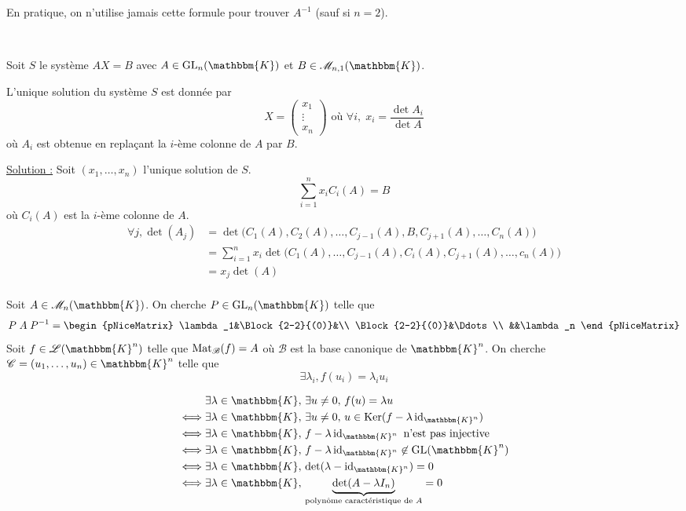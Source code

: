 \begin{rmk}
	En pratique, on n'utilise jamais cette formule pour trouver $A^{-1}$ (sauf si $n = 2$).
\end{rmk}

\begin{exo}~

	Soit $S$ le système $AX = B$ avec $A \in \mathrm{GL}_n(\mathbbm{K})$ et $B \in \mathcal{M}_{n,1}(\mathbbm{K})$.

	L'unique solution du système $S$ est donnée par \[
		X = \begin{pmatrix}
			x_1\\\vdots\\x_n
		\end{pmatrix} \text{ où } \forall i,\; x_i = \frac{\det A_i}{\det A}
	\] où $A_i$ est obtenue en repla\c cant la $i$-ème colonne de $A$ par $B$.

	\underline{Solution :} Soit $(x_1, \ldots, x_n)$ l'unique solution de $S$. \[
		\sum_{i=1}^n x_i C_i(A) = B
	\] où $C_i(A)$ est la $i$-ème colonne de $A$.
	\begin{align*}
		\forall j, \det(A_j) &= \det\big(C_1(A), C_2(A), \ldots, C_{j-1}(A), B, C_{j+1}(A),\ldots, C_n(A)\big)\\
		&= \sum_{i=1}^n x_i \det\big(C_1(A), \ldots, C_{j-1}(A), C_i(A), C_{j+1}(A), \ldots, c_n(A)\big) \\
		&= x_j \det(A) \\
	\end{align*}
\end{exo}


Soit $A \in \mathcal{M}_n(\mathbbm{K})$. On cherche $P \in \mathrm{GL}_n(\mathbbm{K})$ telle que \[
	P\;A\;P^{-1} =
	\begin{pNiceMatrix}
		\lambda_1&\Block{2-2}{(0)}&\\
		\Block{2-2}{(0)}&\Ddots\\
		&&\lambda_n
	\end{pNiceMatrix}
\] Soit $f \in \mathcal{L}(\mathbbm{K}^n)$ telle que $\operatorname{Mat}_\mathcal{B}(f) = A$ où $\mathcal{B}$ est la base canonique de $\mathbbm{K}^n$. On cherche $\mathcal{C} = (u_1, \ldots, u_n) \in \mathbbm{K}^n$ telle que \[
	\exists \lambda_i, f(u_i) = \lambda_i u_i
\]

\begin{align*}
	&\exists \lambda \in \mathbbm{K},\,\exists u\neq 0,\,f(u) = \lambda u\\
	\iff & \exists \lambda \in \mathbbm{K},\,\exists u\neq 0,\, u \in \Ker(f - \lambda \id_{\mathbbm{K}^n})\\
	\iff & \exists \lambda \in \mathbbm{K},\,f-\lambda \id_{\mathbbm{K}^n} \text{ n'est pas injective}\\
	\iff & \exists \lambda \in \mathbbm{K},\, f - \lambda \id_{\mathbbm{K}^n} \not\in \mathrm{GL}(\mathbbm{K}^n)\\
	\iff & \exists \lambda \in \mathbbm{K},\, \det(\lambda - \id_{\mathbbm{K}^n}) = 0\\
	\iff & \exists \lambda \in \mathbbm{K},\,\underbrace{\det(A - \lambda I_n)}_{\text{polynôme caractéristique de $A$}} = 0
\end{align*}

